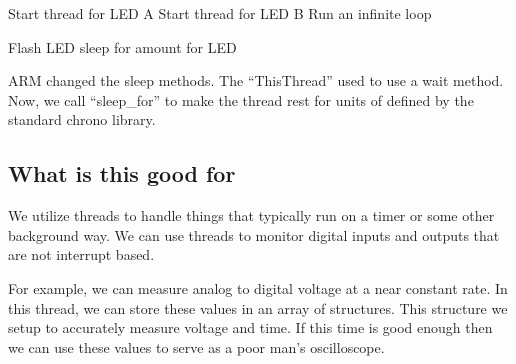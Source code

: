 \documentclass{article}
\begin{document}
\begin{algorithm}
	\begin{algorithmic}
		\STATE Start thread for LED A
		\STATE Start thread for LED B
		\STATE Run an infinite loop
	\end{algorithmic}
	
\end{algorithm}

\begin{algorithmic}
	\WHILE{}
		\STATE Flash LED
		\STATE sleep for amount for LED
	\ENDWHILE
	
\end{algorithmic}

ARM changed the sleep methods.  The ``ThisThread'' used to use a wait method.  Now, we call ``sleep_for'' to make the thread rest for units of defined by the standard chrono library.



 \subsection{What is this good for} %
 \label{sub:what_is_this_good_for}
 We utilize threads to handle things that typically run on a timer or some other background way.  We can use threads to monitor digital inputs and outputs that are not interrupt based.  
 
 For example, we can measure analog to digital voltage at a near constant rate.  In this thread, we can store these values in an array of structures.  This structure we setup to accurately measure voltage and time.  If this time is good enough then we can use these values to serve as a poor man's oscilloscope.  
 
 
 

\end{document}
